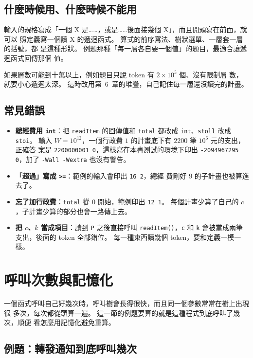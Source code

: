 \subsection{什麼時候用、什麼時候不能用}

輸入的規格寫成「一個 X 是……，或是……後面接幾個 X」，而且開頭寫在前面，就可以
照定義寫一個讀 X 的遞迴函式。 算式的前序寫法、樹狀選單、一層套一層的括號，都
是這種形狀。 例題那種「每一層各自要一個值」的題目，最適合讓遞迴函式回傳那個
值。

如果層數可能到十萬以上，例如題目只說 token 有 $2 \times 10^5$ 個、沒有限制層
數，就要小心遞迴太深。 這時改用第~6~章的堆疊，自己記住每一層還沒讀完的計畫。

\subsection{常見錯誤}

\begin{itemize}
\item \textbf{總經費用 \texttt{int}}：把 \texttt{readItem} 的回傳值和
\texttt{total} 都改成 \texttt{int}、\texttt{stoll} 改成 \texttt{stoi}。 輸入
$W = 10^{12}$，一個行政費 $1$ 的計畫底下有 $2200$ 筆 $10^6$ 元的支出，正確答
案是 \texttt{2200000001 0}，這樣寫在本書測試的環境下印出
\texttt{-2094967295 0}，加了 \texttt{-Wall -Wextra} 也沒有警告。
\item \textbf{「超過」寫成 \texttt{>=}}：範例的輸入會印出 \texttt{16 2}，總經
費剛好 $9$ 的子計畫也被算進去了。
\item \textbf{忘了加行政費}：\texttt{total} 從 $0$ 開始，範例印出
\texttt{12 1}。 每個計畫少算了自己的 $c$，子計畫少算的部分也會一路傳上去。
\item \textbf{把 $c$、$k$ 當成項目}：讀到 \texttt{P} 之後直接呼叫
\texttt{readItem()}，\texttt{c} 和 \texttt{k} 會被當成兩筆支出，後面的 token
全部錯位。 每一種東西讀幾個 token，要和定義一模一樣。
\end{itemize}

\section{呼叫次數與記憶化}
\label{sec:rec-memo}

一個函式呼叫自己好幾次時，呼叫樹會長得很快，而且同一個參數常常在樹上出現很
多次，每次都從頭算一遍。 這一節的例題要算的就是這種程式到底呼叫了幾次，順便
看怎麼用記憶化避免重算。

\subsection{例題：轉發通知到底呼叫幾次}
\label{sec:rec-ex-notice}


